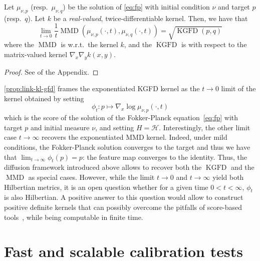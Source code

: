 \documentclass{uai2023} %
\begin{document}
\begin{proposition}\label{prop:link-kl-gfd}
    Let $\mu_{\nu, p} $ (resp.\ $ \mu_{\nu, q} $)
    be the solution of \cref{eq:fp} with initial
    condition $ \nu $ and target $ p $ (resp.\ $q$). Let $ k $ be a \emph{real-valued},
    twice-differentiable kernel.
    Then, we have that
    \begin{equation*}
        \lim_{t \to 0} \frac{1}{t}\operatorname{MMD}(\mu_{\nu, p}(\cdot, t), \mu_{\nu, q}(\cdot, t)) = \sqrt { \operatorname{KGFD}(p, q) } 
    \end{equation*}
    where the $ \operatorname{MMD} $ is w.r.t.\ the kernel $ k $, and the $\operatorname{KGFD}$ is with respect to the matrix-valued kernel
    $ \nabla_{x} \nabla_{ y } k(x, y) $.
\end{proposition}
\begin{proof}
    See  of the Appendix.
\end{proof}
\cref{prop:link-kl-gfd} frames the exponentiated KGFD kernel as the $ t  \to 0
$ limit of the kernel obtained by setting
\begin{equation*}
\phi_t \colon p  \longmapsto \nabla_x \log \mu_{\nu, p}(\cdot, t)
\end{equation*}
which is the score of the solution of the Fokker-Planck equation~\cref{eq:fp}
with target $ p $ and initial measure $ \nu $, and setting $ H = \mathcal  H $.
Interestingly, the other limit case $ t  \to \infty $ recovers 
the exponentiated MMD kernel.
Indeed, under mild conditions, the Fokker-Planck solution converges to the
target and thus we have that $ \lim_{  t \to \infty }\phi_t(p) = p  $: the
feature map converges to the identity. Thus, the diffusion framework introduced
above allows to recover both the $ \operatorname{KGFD} $ and the $ \operatorname{MMD} $ as
special cases. However, while the limit $ t  \to 0 $ and $ t  \to \infty $
yield both Hilbertian metrics, it is an open question whether for a given time
$0 < t < \infty$,  $ \phi_t $ is also Hilbertian. A positive answer to this question would
allow to construct positive definite kernels that can possibly overcome the
pitfalls of score-based tools~\citep{wenliang2020blindness, zhang2022towards},
while being computable in finite time.

\section{Fast and scalable calibration tests}\label{sec:fast-calibration-tests}
\end{document}
